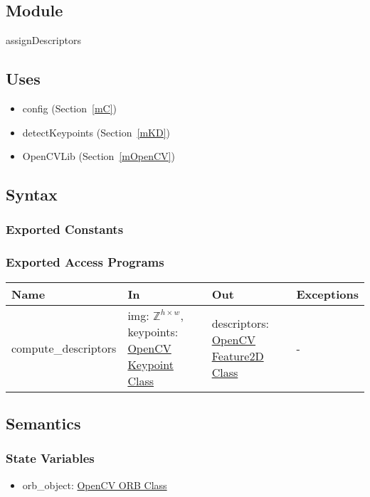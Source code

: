 \documentclass[12pt, titlepage]{article}
\begin{document}
\subsection{Module}

assignDescriptors

\subsection{Uses}
\begin{itemize}
  \item config (Section~\ref{mC})
  \item detectKeypoints (Section~\ref{mKD})
  \item OpenCVLib (Section~\ref{mOpenCV})
\end{itemize}

\subsection{Syntax}

\subsubsection{Exported Constants}

\subsubsection{Exported Access Programs}

\begin{center}
\begin{tabular}{p{4cm} p{5cm} p{4cm} p{2cm}}
\hline
\textbf{Name} & \textbf{In} & \textbf{Out} & \textbf{Exceptions} \\
\hline
compute\_descriptors
& img: $\mathbb{Z}^{h \times w}$, \newline
keypoints: \href{https://docs.opencv.org/3.4/d2/d29/classcv_1_1KeyPoint.html}{OpenCV Keypoint Class}
& descriptors: \href{https://docs.opencv.org/4.x/d0/d13/classcv_1_1Feature2D.html}{OpenCV Feature2D Class}
& - \\
\hline
\end{tabular}
\end{center}

\subsection{Semantics}
\subsubsection{State Variables}
\begin{itemize}
\item orb\_object: \href{https://docs.opencv.org/3.4/db/d95/classcv_1_1ORB.html}{OpenCV ORB Class}
\end{itemize}
\end{document}
